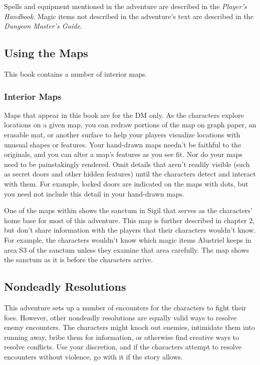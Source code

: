 \documentclass[10pt,a4paper,twoside,bg=print,twocolumn,openany,nodeprecatedcode]{dndbook}
\begin{document}
Spells and equipment mentioned in the adventure are described in the \textit{Player's Handbook}. Magic items not described in the adventure's text are described in the \textit{Dungeon Master's Guide}.

\subsection{Using the Maps}
This book contains a number of interior maps.

\subsubsection{Interior Maps}
Maps that appear in this book are for the DM only. As the characters explore locations on a given map, you can redraw portions of the map on graph paper, an erasable mat, or another surface to help your players visualize locations with unusual shapes or features. Your hand-drawn maps needn't be faithful to the originals, and you can alter a map's features as you see fit. Nor do your maps need to be painstakingly rendered. Omit details that aren't readily visible (such as secret doors and other hidden features) until the characters detect and interact with them. For example, locked doors are indicated on the maps with dots, but you need not include this detail in your hand-drawn maps.

One of the maps within shows the sanctum in Sigil that serves as the characters' home base for most of this adventure. This map is further described in chapter 2, but don't share information with the players that their characters wouldn't know. For example, the characters wouldn't know which magic items Alustriel keeps in area S3 of the sanctum unless they examine that area carefully. The map shows the sanctum as it is before the characters arrive.

\subsection{Nondeadly Resolutions}
This adventure sets up a number of encounters for the characters to fight their foes. However, other nondeadly resolutions are equally valid ways to resolve enemy encounters. The characters might knock out enemies, intimidate them into running away, bribe them for information, or otherwise find creative ways to resolve conflicts. Use your discretion, and if the characters attempt to resolve encounters without violence, go with it if the story allows.
\end{document}

